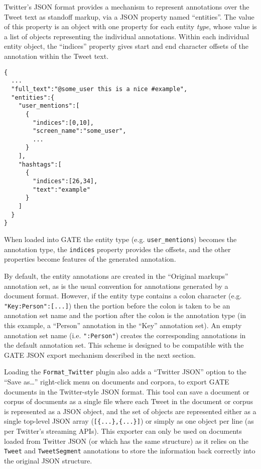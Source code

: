Twitter's JSON format provides a mechanism to represent annotations over the
Tweet text as standoff markup, via a JSON property named ``entities''.  The
value of this property is an object with one property for each entity
\emph{type}, whose value is a list of objects representing the individual
annotations.  Within each individual entity object, the ``indices'' property
gives start and end character offsets of the annotation within the Tweet text.

\begin{verbatim}
{
  ...
  "full_text":"@some_user this is a nice #example",
  "entities":{
    "user_mentions":[
      {
        "indices":[0,10],
        "screen_name":"some_user",
        ...
      }
    ],
    "hashtags":[
      {
        "indices":[26,34],
        "text":"example"
      }
    ]
  }
}
\end{verbatim}

When loaded into GATE the entity type (e.g.
\verb!user_mentions!) becomes the annotation type, the \verb!indices!  property
provides the offsets, and the other properties become features of the generated
annotation.

By default, the entity annotations are created in the ``Original markups''
annotation set, as is the usual convention for annotations generated by a
document format.  However, if the entity type contains a colon character (e.g.
\verb!"Key:Person":[...]!) then the portion before the colon is taken to be an
annotation set name and the portion after the colon is the annotation type (in
this example, a ``Person'' annotation in the ``Key'' annotation set).  An
empty annotation set name (i.e. \verb!":Person"!) creates the corresponding
annotations in the default annotation set.  This scheme is designed to be
compatible with the GATE JSON export mechanism described in the next section.


Loading the \verb!Format_Twitter! plugin also adds a ``Twitter JSON'' option to the
``Save as\ldots'' right-click menu on documents and corpora, to export GATE
documents in the Twitter-style JSON format.  This tool can save a document or
corpus of documents as a single file where each Tweet in the document or corpus
is represented as a JSON object, and the set of objects are represented either
as a single top-level JSON array (\verb![{...},{...}]!) or simply as one object
per line (as per Twitter's streaming APIs).  This exporter can only be used on
documents loaded from Twitter JSON (or which has the same structure) as it
relies on the \verb!Tweet! and \verb!TweetSegment! annotations to store the
information back correctly into the original JSON structure.

